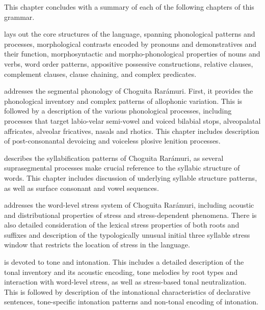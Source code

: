 This chapter concludes with a summary of each of the following chapters of this grammar.

\medskip
\noindent \textbf{} lays out the core structures of the language, spanning phonological patterns and processes, morphological contrasts encoded by pronouns and demonstratives and their function, morphosyntactic and morpho-phonological properties of nouns and verbs, word order patterns, appositive possessive constructions, relative clauses, complement clauses, clause chaining, and complex predicates.

\medskip

\noindent \textbf{} addresses the segmental phonology of Choguita Rarámuri. First, it provides the phonological inventory and complex patterns of allophonic variation. This is followed by a description of the various phonological processes, including processes that target labio-velar semi-vowel and voiced bilabial stops, alveopalatal affricates, alveolar fricatives, nasals and rhotics. This chapter includes description of post-consonantal devoicing and voiceless plosive lenition processes.

\medskip

\noindent \textbf{} describes the syllabification patterns of Choguita Rarámuri, as several suprasegmental processes make crucial reference to the syllabic structure of words. This chapter includes discussion of underlying syllable structure patterns, as well as surface consonant and vowel sequences.

\medskip

\noindent \textbf{\textbf{}} addresses the word-level stress system of Choguita Rarámuri, including acoustic and distributional properties of stress and stress-dependent phenomena. There is also detailed consideration of the lexical stress properties of both roots and suffixes and description of the typologically unusual initial three syllable stress window that restricts the location of stress in the language.

\medskip

\noindent \textbf{} is devoted to tone and intonation. This includes a detailed description of the tonal inventory and its acoustic encoding, tone melodies by root types and interaction with word-level stress, as well as stress-based tonal neutralization. This is followed by description of the intonational characteristics of declarative sentences, tone-specific intonation patterns and non-tonal encoding of intonation.

